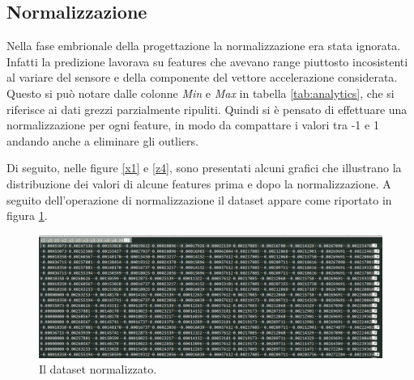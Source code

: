 \documentclass[12pt]{article}
\begin{document}
\subsection{Normalizzazione}
Nella fase embrionale della progettazione la normalizzazione era stata ignorata. Infatti la predizione lavorava su features che avevano range piuttosto incosistenti al variare del sensore e della componente del vettore accelerazione considerata. Questo si può notare dalle colonne \textit{Min} e \textit{Max} in tabella \ref{tab:analytics}, che si riferisce ai dati grezzi parzialmente ripuliti. Quindi si è pensato di effettuare una normalizzazione per ogni feature, in modo da compattare i valori tra -1 e 1 andando anche a eliminare gli outliers. \par
Di seguito, nelle figure \ref{x1} e \ref{z4}, sono presentati alcuni grafici che illustrano la distribuzione dei valori di alcune features prima e dopo la normalizzazione. A seguito dell'operazione di normalizzazione il dataset appare come riportato in figura \ref{normalized}.

\begin{figure}[H]
	\includegraphics[width=1\textwidth]{images/datasetNormalizzato.PNG}
	\caption{Il dataset normalizzato.}
	\label{normalized}
\end{figure}
\end{document}
